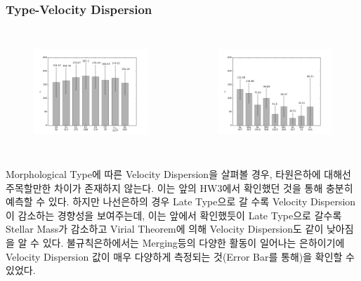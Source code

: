 \documentclass[xcolor={dvipsnames,table}]{beamer}
\newcommand\SSM{\fontsize{7}{7.2}\selectfont}
\begin{document}
\begin{frame}
 \frametitle{Type-Velocity Dispersion}
 \SSM
  \begin{columns}[t]
   \begin{figure}
    \centering
    \includegraphics[width=6cm, height=4cm]{elsigma.png}
   \end{figure}
   \begin{figure}
    \centering
    \includegraphics[width=6cm, height=4cm]{spsigma.png}
   \end{figure}
  \end{columns}
\vspace{0.2cm}
Morphological Type에 따른 Velocity Dispersion을 살펴볼 경우, 타원은하에 대해선 주목할만한 차이가 존재하지 않는다. 이는
앞의 HW3에서 확인했던 것을 통해 충분히 예측할 수 있다.
하지만 나선은하의 경우 Late Type으로 갈 수록 Velocity Dispersion이 감소하는 경향성을 보여주는데, 이는 앞에서 확인했듯이
Late Type으로 갈수록 Stellar Mass가 감소하고 Virial Theorem에 의해 Velocity Dispersion도 같이 낮아짐을 알 수 있다.
불규칙은하에서는 Merging등의 다양한 활동이 일어나는 은하이기에 Velocity Dispersion 값이 매우 다양하게 측정되는 것(Error
Bar를 통해)을 확인할 수 있었다.
\end{frame}
\end{document}
